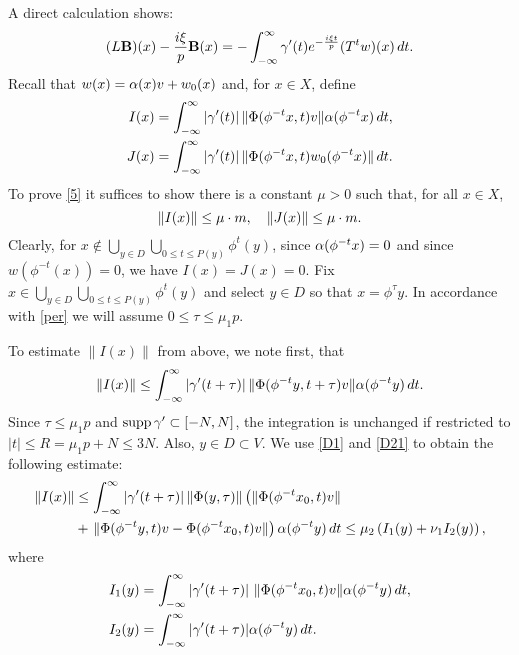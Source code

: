 A direct calculation shows:
\begin{equation}
(L\bB)(x)- \dfrac{i\xi}{p} \bB (x)
			=-\int_{-\infty}^\infty \gam' (t) e^{-\frac{i\xi t}p} 
			(T^t w)(x) \, dt.
\lb{4}
\end{equation}
Recall that $w(x)=\alpha(x)v+w_0(x)$ and, for $x\in X$, define
\begin{align*}
I(x) & = \int_{-\infty}^\infty |\gamma' (t) | \, \|\Phi (\phi^{-t} x,
t)v \| \alpha (\phi^{-t} x)\, dt,\\
J(x) & = \int_{-\infty}^\infty |\gamma' (t) | \, \| \Phi (\phi^{-t} x, t)
w_0 (\phi^{-t} x) \| \, dt.
\end{align*}
To prove \eqref{5} it suffices to show there is a constant $\mu>0$ 
such that, for all $x\in X$, 
\begin{equation}
\| I(x) \| \leq \mu \cdot m,\quad \| J(x) \| \leq \mu\cdot m.
\lb{6}
\end{equation}
Clearly, for 
$x\not\in \bigcup_{y\in D} \bigcup_{0 \leq t \leq P(y)} \phi^t (y)$,
since
$\alpha (\phi^{-t} x)=0$ and since $w(\phi^{-t}(x))=0$,
we have $I(x) = J(x) =0$. 
Fix $x\in \bigcup_{y\in D}\bigcup_{0 \leq t\leq P(y)} \phi^t (y)$ and
select $y\in D$ so that $x=\phi^\tau y$.  
In accordance with \eqref{per} we will
assume $0\leq \tau \leq \mu_1 p$.

To estimate $\| I (x)\|$ from above, we note first, that
$$
 \| I (x) \| \leq \int_{-\infty}^\infty | \gamma' (t+ \tau)| \, \| \Phi
(\phi^{-t} y, t+ \tau) v\| \alpha (\phi^{-t} y) \, dt.
$$
Since $\tau\le \mu_1p$ and $\operatorname{supp} \gamma'\subset [-N,N]$,
the integration is unchanged if restricted to
$|t|\le R=\mu_1p+N\le 3N$. Also, $y\in D\subset V$.
We use \eqref{D1} and \eqref{D21} to obtain the following estimate:
\begin{align}
\| I(x) \| & \leq \int_{-\infty}^\infty |\gam' (t+ \tau) | \, \| \Phi
(y,\tau)\| 
\left(\|\Phi (\phi^{-t} x_0, t) v \|\right.\\
&+\left.\| \Phi (\phi^{-t} y, t) v -\Phi (\phi^{-t} x_0, t) v \|\right)
\lb{eestI}
\al (\phi^{-t} y) \, dt  
 \leq \mu_2 \left( I_1 (y) +\nu_1 I_2 (y)\right),\nonumber
\end{align}
where 
\begin{align*}
I_1 (y) & = \int_{-\infty}^\infty | \gamma' (t+ \tau) | \, \, \| \Phi
(\phi^{-t} x_0, t) v \| \alpha (\phi^{-t} y) \, dt,\\
I_2 (y) & = \int_{-\infty}^\infty | \gamma' (t+ \tau)| \alpha (\phi^{-t} y)
\, dt.
\end{align*}

